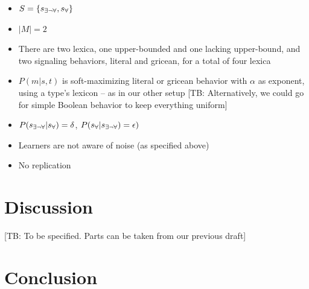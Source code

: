 \documentclass[11pt]{article}
\newcommand{\tb}[1]{\textcolor[rgb]{.8,.33,.0}{[TB: #1]}}%
\newcommand{\state}{\ensuremath{s}\xspace}		%
\newcommand{\mystate}[1]{\ensuremath{\state_{\text{#1}}}\xspace} %
\newcommand{\ssome}{\mystate{\ensuremath{\exists\neg\forall}}}
\newcommand{\sall}{\mystate{\ensuremath{\forall}}}
\begin{document}
\begin{itemize}
  \item $S = \{\ssome, \sall\}$
  \item $|M| = 2$
  \item There are two lexica, one upper-bounded and one lacking upper-bound, and two signaling behaviors, literal and gricean, for a total of four lexica
  \item $P(m|s,t)$ is soft-maximizing literal or gricean behavior with $\alpha$ as exponent, using a type's lexicon -- as in our other setup \tb{Alternatively, we could go for simple Boolean behavior to keep everything uniform}
  \item $P(\ssome|\sall) = \delta$, $P(\sall|\ssome) = \epsilon)$
  \item Learners are not aware of noise (as specified above)
  \item No replication
\end{itemize}



\section{Discussion}
\tb{To be specified. Parts can be taken from our previous draft} 

\section{Conclusion}




\end{document}
